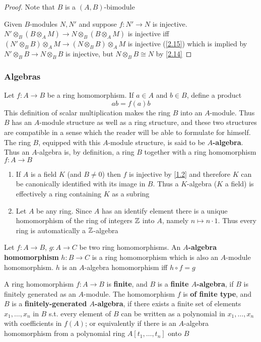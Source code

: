 \documentclass[11pt]{article}
\begin{document}
\begin{proof}
Note that \(B\) is a \((A,B)\)-bimodule

Given \(B\)-modules \(N,N'\) and suppose \(f:N'\to N\) is injective.
\(N'\otimes_B(B\otimes_AM)\to N\otimes_B(B\otimes_AM)\) is injective iff
\((N'\otimes_BB)\otimes_AM\to(N\otimes_BB)\otimes_AM\) is injective (\ref{2.15}) which is implied by
\(N'\otimes_BB\to N\otimes_BB\) is injective, but \(N\otimes_BB\cong N\) by \ref{2.14}
\end{proof}
\subsubsection*{Algebras}
\label{sec:org274bd3e}
Let \(f:A\to B\) be a ring homomorphism. If \(a\in A\) and \(b\in B\), define a product
\begin{equation*}
ab=f(a)b
\end{equation*}
This definition of scalar multiplication makes the ring \(B\) into an \(A\)-module. Thus \(B\)
has an \(A\)-module structure as well as a ring structure, and these two structures are
compatible in a sense which the reader will be able to formulate for himself. The ring \(B\),
equipped with this \(A\)-module structure, is said to be \textbf{\(A\)-algebra}. Thus an \(A\)-algebra
is, by definition, a ring \(B\) together with a ring homomorphism \(f:A\to B\)

\begin{remark}
\begin{enumerate}
\item If \(A\) is a field \(K\) (and \(B\neq 0\)) then \(f\) is injective by \ref{1.2} and
therefore \(K\) can be canonically identified with its image in \(B\). Thus a \(K\)-algebra
(\(K\) a field) is effectively a ring containing \(K\) as a subring
\item Let \(A\) be any ring. Since \(A\) has an identify element there is a unique homomorphism of
the ring of integers \(\mathbb{Z}\) into \(A\), namely \(n\mapsto n\cdot 1\). Thus every ring is automatically
a \(\mathbb{Z}\)-algebra
\end{enumerate}
\end{remark}

Let \(f:A\to B\), \(g:A\to C\) be two ring homomorphisms. An \textbf{\(A\)-algebra homomorphism} \(h:B\to C\)
is a ring homomorphism which is also an \(A\)-module homomorphism. \(h\) is an \(A\)-algebra
homomorphism iff \(h\circ f=g\)

A ring homomorphism \(f:A\to B\) is \textbf{finite}, and \(B\) is a \textbf{finite \(A\)-algebra}, if \(B\) is
finitely generated as an \(A\)-module. The homomorphism \(f\) is \textbf{of finite type}, and \(B\) is a
\textbf{finitely-generated \(A\)-algebra}, if there exists a finite set of elements \(x_1,\dots,x_n\) in \(B\)
s.t. every element of \(B\) can be written as a polynomial in \(x_1,\dots,x_n\) with coefficients
in \(f(A)\); or equivalently if there is an \(A\)-algebra homomorphism from a polynomial
ring \(A[t_1,\dots,t_n]\) onto \(B\)
\end{document}
